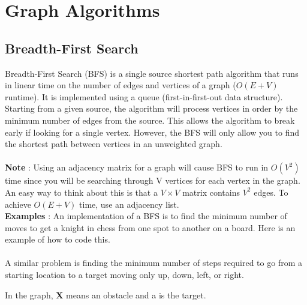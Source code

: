 
\chapter{Graph Algorithms}
\chapterinfo{}
	\section{Breadth-First Search}
	
	Breadth-First Search (BFS) is a single source shortest path algorithm that 
	runs in linear time on the number of edges and vertices of a graph 
	($O\left(E+V\right)$ runtime). It is implemented using a queue 
	(first-in-first-out data structure). Starting from a given source, the 
	algorithm will process vertices in order by the minimum number of edges 
	from the source. This allows the algorithm to break early if looking for a 
	single vertex. However, the BFS will only allow you to find the shortest 
	path between vertices in an unweighted graph.\\
	\ \\
	{\bf Note} : Using an adjacency matrix for a graph will cause BFS to run in 
	$O\left(V^2\right)$ time since you will be searching through V vertices for 
	each vertex in the graph. An easy way to think about this is that a 
	$V \times V$ matrix contains $V^2$ edges. To achieve $O\left(E+V\right)$ 
	time, use an adjacency list.\\
	{\bf Examples} :
	An implementation of a BFS is to find the minimum number of moves to get a 
	knight in chess from one spot to another on a board. Here is an example of 
	how to code this.\\
	
	
    \ \\
    A similar problem is finding the minimum number of steps required to go from 
    a starting location to a target moving only up, down, left, or right.
    
    In the graph, {\bf X} means an obstacle and a {\bf *} is the target. \\
    
    
    
